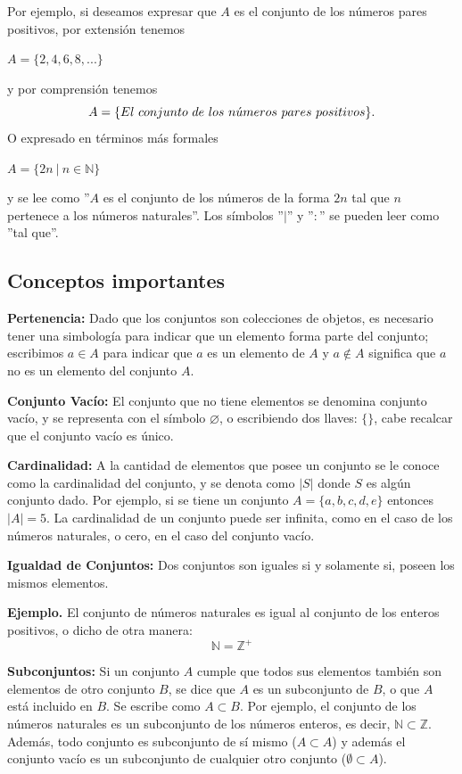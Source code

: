 Por ejemplo, si deseamos expresar que $A$ es el conjunto de los números pares positivos, por extensión tenemos

\begin{center}
    $A=\{2,4,6,8,...\}$
\end{center}

y por comprensión tenemos $$A=\{El \ conjunto \ de \ los \ n\Acute{u}meros \ pares \ positivos\}.$$ O expresado en términos más formales

\begin{center}
    $A=\{2n \ | \ n \in \mathbb{N} \}$
\end{center}

y se lee como ''$A$ es el conjunto de los números de la forma $2n$ tal que $n$ pertenece a los números naturales''. Los símbolos ''$|$'' y ''$:$'' se pueden leer como ''tal que''.

\subsection{Conceptos importantes}

\textbf{Pertenencia:} Dado que los conjuntos son colecciones de objetos, es necesario tener una simbología para indicar que un elemento forma parte del conjunto; escribimos $a\in A$ para indicar que $a$ es un elemento de $A$ y $a \notin A$ significa que $a$ no es un elemento del conjunto $A$.   

\textbf{Conjunto Vacío:} El conjunto que no tiene  elementos se denomina conjunto vacío, y se representa con el símbolo $\varnothing$, o escribiendo dos llaves: $\{\}$, cabe recalcar que el conjunto vacío es único.

\textbf{Cardinalidad:} A la cantidad de elementos que posee un conjunto se le conoce como la cardinalidad del conjunto, y se denota como $|S|$ donde $S$ es algún conjunto dado. Por ejemplo, si se tiene un conjunto $A=\{a, b, c, d, e\}$ entonces $|A|= 5$. La cardinalidad de un conjunto puede ser infinita, como en el caso de los números naturales, o cero, en el caso del conjunto vacío.

\textbf{Igualdad de Conjuntos:} Dos conjuntos son iguales si y solamente si, poseen los mismos elementos.

\textbf{Ejemplo.} El conjunto de números naturales es igual al conjunto de los enteros positivos, o dicho de otra manera: $$\mathbb{N}=\mathbb{Z}^+$$

\textbf{Subconjuntos:} Si un conjunto $A$ cumple que todos sus elementos también son elementos de otro conjunto $B$, se dice que $A$ es un subconjunto de $B$, o que $A$ está incluido en $B$. Se escribe como $A \subset B$.  Por ejemplo, el conjunto de los números naturales es un subconjunto de los números enteros, es decir, $\mathbb{N} \subset \mathbb{Z}$. Además, todo conjunto es subconjunto de sí mismo ($A\subset A$) y además el conjunto vacío es un subconjunto de cualquier otro conjunto ($\emptyset \subset A$).

